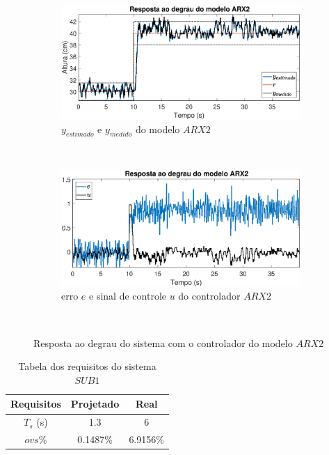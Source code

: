 \begin{figure}[htb]
	\centering
	\begin{subfigure}[t]{0.48\textwidth}
		\includegraphics[width=1\linewidth]{steprarx2y}
		\caption[$y_{estimado}$ e $y_{medido}$ do modelo $ARX2$]{$y_{estimado}$ e $y_{medido}$ do modelo $ARX2$}
		\label{fig:steprarx2y}
	\end{subfigure}
	~ %
	\begin{subfigure}[t]{0.48\textwidth}
		\includegraphics[width=1\linewidth]{steprarx2e}
		\caption[erro $e$ e sinal de controle $u$ do controlador $ARX2$]{erro $e$ e sinal de controle $u$ do controlador $ARX2$}
		\label{fig:steprarx2e}
	\end{subfigure}
	~ %
	
	\caption{Resposta ao degrau do sistema com o controlador do modelo $ARX2$}\label{fig:steprarx2}
\end{figure}

\begin{table}[htb]
	\centering
	\begin{tabular}{|c|c|c|}
		\hline 
		Requisitos & Projetado & Real \\ 
		\hline 
		$T_s$ (s) & 1.3 & 6 \\ 
		\hline 
		$ovs\%$ & 0.1487\% & 6.9156\% \\ 
		\hline 
	\end{tabular} 
	\caption{Tabela dos requisitos do sistema $SUB1$}
	\label{tb:reqarx2}
\end{table}

